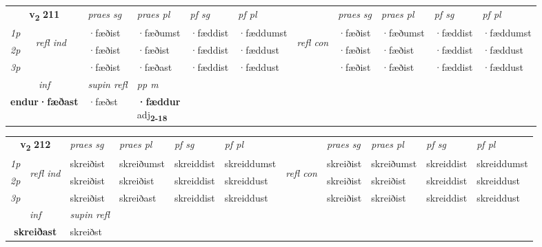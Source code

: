 \noindent
\begin{tabular}{lllllllllll} \toprule
\multicolumn{2}{c}{\textbf{v{\textsubscript{2}}} \Large{\textbf{211}}}  &  \textit{praes sg}  & \textit{praes pl}  &\textit{ pf sg} & \textit{pf pl} &  &  \textit{praes sg}  & \textit{praes pl}  & \textit{pf sg} & \textit{pf pl } \\*
	\cmidrule{3-6} \cmidrule{8-11}
 {\textit{1p}} & \multirow{3}{*}{\begin{turn}{90}\textit{refl ind}\end{turn}}  & ·fæðist & ·fæðumst & ·fæddist & ·fæddumst & \multirow{3}{*}{\begin{turn}{90}\textit{refl con}\end{turn}}  &·fæðist & ·fæðumst & ·fæddist & ·fæddumst \\*
 {\textit{2p}} &  & ·fæðist & ·fæðist & ·fæddist & ·fæddust & &·fæðist & ·fæðist & ·fæddist & ·fæddust \\*
 {\textit{3p}}  & & ·fæðist & ·fæðast & ·fæddist & ·fæddust & & ·fæðist & ·fæðist& ·fæddist & ·fæddust \\*
\cmidrule{3-6} \cmidrule{8-11}

   \multicolumn{2}{c}{\textit{inf}}       & \textit{supin refl} & \textit{pp m} \\*
  \multicolumn{2}{c}{\textbf{endur\allowbreak ·fæðast}}        & ·fæðst & \specialcell{\textbf{·fæddur} \\ adj\textbf{\textsubscript{2-18}}} \\*
\end{tabular}

\noindent
\begin{tabular}{lllllllllll} \toprule
\multicolumn{2}{c}{\textbf{v{\textsubscript{2}}} \Large{\textbf{212}}}  &  \textit{praes sg}  & \textit{praes pl}  &\textit{ pf sg} & \textit{pf pl} &  &  \textit{praes sg}  & \textit{praes pl}  & \textit{pf sg} & \textit{pf pl } \\*
	\cmidrule{3-6} \cmidrule{8-11}
 {\textit{1p}} & \multirow{3}{*}{\begin{turn}{90}\textit{refl ind}\end{turn}}  & skreiðist & skreiðumst & skreiddist & skreiddumst & \multirow{3}{*}{\begin{turn}{90}\textit{refl con}\end{turn}}  &skreiðist & skreiðumst & skreiddist & skreiddumst \\*
 {\textit{2p}} &  & skreiðist & skreiðist & skreiddist & skreiddust & &skreiðist & skreiðist & skreiddist & skreiddust \\*
 {\textit{3p}}  & & skreiðist & skreiðast & skreiddist & skreiddust & & skreiðist & skreiðist& skreiddist & skreiddust \\*
\cmidrule{3-6} \cmidrule{8-11}

   \multicolumn{2}{c}{\textit{inf}}       & \textit{supin refl}  \\*
  \multicolumn{2}{c}{\textbf{skreiðast}}        & skreiðst  \\*
\end{tabular}

